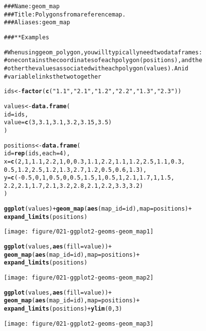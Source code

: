 \documentclass[a4paper,titlepage]{tufte-handout}\usepackage{graphicx, color}
\makeatletter
\def\maxwidth{ %
  \ifdim\Gin@nat@width>\linewidth
    \linewidth
  \else
    \Gin@nat@width
  \fi
}
\newcommand{\hlfunctioncall}[1]{\textcolor[rgb]{0.501960784313725,0,0.329411764705882}{\textbf{#1}}}%
\newcommand{\hlstring}[1]{\textcolor[rgb]{0.6,0.6,1}{#1}}%
\newcommand{\hlcomment}[1]{\textcolor[rgb]{0.180392156862745,0.6,0.341176470588235}{#1}}%
\newenvironment{kframe}{%
 \def\at@end@of@kframe{}%
 \ifinner\ifhmode%
  \def\at@end@of@kframe{\end{minipage}}%
  \begin{minipage}{\columnwidth}%
 \fi\fi%
 \def\FrameCommand##1{\hskip\@totalleftmargin \hskip-\fboxsep
 \colorbox{shadecolor}{##1}\hskip-\fboxsep
     \hskip-\linewidth \hskip-\@totalleftmargin \hskip\columnwidth}%
 \MakeFramed {\advance\hsize-\width
   \@totalleftmargin\z@ \linewidth\hsize
   \@setminipage}}%
 {\par\unskip\endMakeFramed%
 \at@end@of@kframe}
\newenvironment{knitrout}{}{} %
\makeatother
\begin{document}
\begin{knitrout}
\color{fgcolor}\begin{kframe}
\begin{alltt}
\hlcomment{### Name: geom_map}
\hlcomment{### Title: Polygons from a reference map.}
\hlcomment{### Aliases: geom_map}

\hlcomment{### ** Examples}

\hlcomment{# When using geom_polygon, you will typically need two data frames:}
\hlcomment{# one contains the coordinates of each polygon (positions),  and the}
\hlcomment{# other the values associated with each polygon (values).  An id}
\hlcomment{# variable links the two together}

ids <- \hlfunctioncall{factor}(\hlfunctioncall{c}(\hlstring{"1.1"}, \hlstring{"2.1"}, \hlstring{"1.2"}, \hlstring{"2.2"}, \hlstring{"1.3"}, \hlstring{"2.3"}))

values <- \hlfunctioncall{data.frame}(
  id = ids,
  value = \hlfunctioncall{c}(3, 3.1, 3.1, 3.2, 3.15, 3.5)
)

positions <- \hlfunctioncall{data.frame}(
  id = \hlfunctioncall{rep}(ids, each = 4),
  x = \hlfunctioncall{c}(2, 1, 1.1, 2.2, 1, 0, 0.3, 1.1, 2.2, 1.1, 1.2, 2.5, 1.1, 0.3,
  0.5, 1.2, 2.5, 1.2, 1.3, 2.7, 1.2, 0.5, 0.6, 1.3),
  y = \hlfunctioncall{c}(-0.5, 0, 1, 0.5, 0, 0.5, 1.5, 1, 0.5, 1, 2.1, 1.7, 1, 1.5,
  2.2, 2.1, 1.7, 2.1, 3.2, 2.8, 2.1, 2.2, 3.3, 3.2)
)

\hlfunctioncall{ggplot}(values) + \hlfunctioncall{geom_map}(\hlfunctioncall{aes}(map_id = id), map = positions) +
  \hlfunctioncall{expand_limits}(positions)
\end{alltt}
\end{kframe}
\texttt{[image: figure/021-ggplot2-geoms-geom\_map1]} 
\begin{kframe}\begin{alltt}
\hlfunctioncall{ggplot}(values, \hlfunctioncall{aes}(fill = value)) +
  \hlfunctioncall{geom_map}(\hlfunctioncall{aes}(map_id = id), map = positions) +
  \hlfunctioncall{expand_limits}(positions)
\end{alltt}
\end{kframe}
\texttt{[image: figure/021-ggplot2-geoms-geom\_map2]} 
\begin{kframe}\begin{alltt}
\hlfunctioncall{ggplot}(values, \hlfunctioncall{aes}(fill = value)) +
  \hlfunctioncall{geom_map}(\hlfunctioncall{aes}(map_id = id), map = positions) +
  \hlfunctioncall{expand_limits}(positions) + \hlfunctioncall{ylim}(0, 3)
\end{alltt}
\end{kframe}
\texttt{[image: figure/021-ggplot2-geoms-geom\_map3]} 
\begin{kframe}\begin{alltt}


\end{alltt}
\end{kframe}
\end{knitrout}
\end{document}
